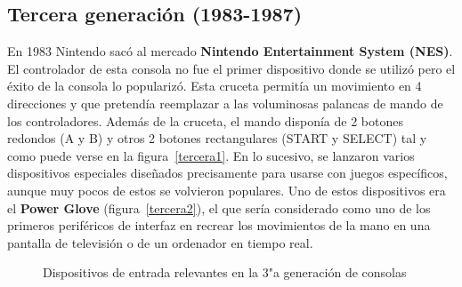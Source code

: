 \subsection{Tercera generaci\'on (1983-1987)}


En 1983 Nintendo sac\'o al mercado \textbf{Nintendo Entertainment System (NES)}. El controlador de esta consola no fue el primer dispositivo donde se utiliz\'o pero el \'exito de la consola lo populariz\'o. Esta cruceta permit\'ia un movimiento en 4 direcciones y que pretend\'ia reemplazar a las voluminosas palancas de mando de los controladores. Adem\'as de la cruceta, el mando dispon\'ia de 2 botones redondos (A y B) y otros 2 botones rectangulares (START y SELECT) tal y como puede verse en la figura~\ref{tercera1}. En lo sucesivo, se lanzaron varios dispositivos especiales dise\~nados precisamente para usarse con juegos espec\'ificos, aunque muy pocos de estos se volvieron populares. Uno de estos dispositivos era el \textbf{Power Glove} (figura~\ref{tercera2}), el que ser\'ia considerado como uno de los primeros perif\'ericos de interfaz en recrear los movimientos de la mano en una pantalla de televisi\'on o de un ordenador en tiempo real. \\

\begin{figure}[t]
     \hfill
     \caption{Dispositivos de entrada relevantes en la 3"a  generaci\'on de consolas}
     \label{fig:tercera}
   \end{figure}

